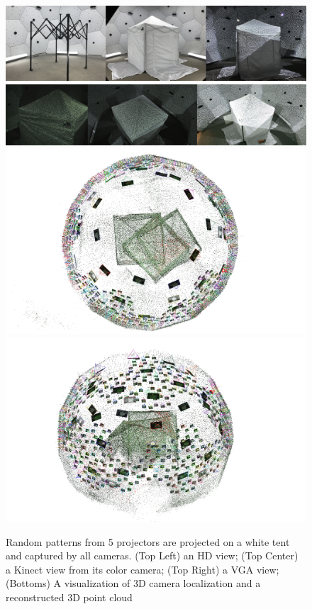 \begin{figure}
	\centering
	\includegraphics[width=\linewidth]{fig_system/cali_tent_3rdViews}\\
	\vspace{0.2cm}
	\includegraphics[width=\linewidth]{fig_system/cali_tent_camViews}\\
	\includegraphics[trim=70 0 70 0,clip,width=0.45\columnwidth]{figures/domeCalib/38}  
	\includegraphics[trim=60 0 80 0,clip,width=0.45\columnwidth]{figures/domeCalib/39}  
	\caption{Random patterns from 5 projectors are projected on a white tent and captured by all cameras. (Top Left) an HD view; (Top Center) a Kinect view from its color camera; (Top Right) a VGA view; (Bottoms) A visualization of 3D camera localization and a reconstructed 3D point cloud} 
	\label{fig:spatialCalibration}
\end{figure}
